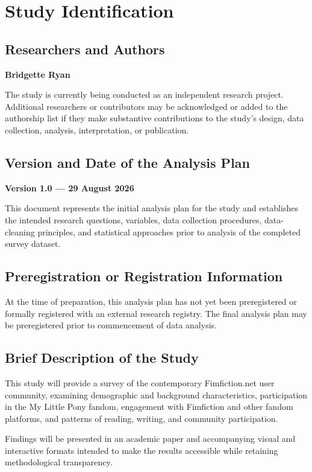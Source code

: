\section{Study Identification}


\subsection{Researchers and Authors}

\textbf{Bridgette Ryan}

The study is currently being conducted as an independent research project. Additional researchers or contributors may be acknowledged or added to the authorship list if they make substantive contributions to the study's design, data collection, analysis, interpretation, or publication.

\subsection{Version and Date of the Analysis Plan}

\textbf{Version 1.0 --- 29 August 2026}

This document represents the initial analysis plan for the study and establishes the intended research questions, variables, data collection procedures, data-cleaning principles, and statistical approaches prior to analysis of the completed survey dataset.


\subsection{Preregistration or Registration Information}

At the time of preparation, this analysis plan has not yet been preregistered or formally registered with an external research registry. The final analysis plan may be preregistered prior to commencement of data analysis.


\subsection{Brief Description of the Study}

This study will provide a survey of the contemporary Fimfiction.net user community, examining demographic and background characteristics, participation in the My Little Pony fandom, engagement with Fimfiction and other fandom platforms, and patterns of reading, writing, and community participation.

Findings will be presented in an academic paper and accompanying visual and interactive formats intended to make the results accessible while retaining methodological transparency.
